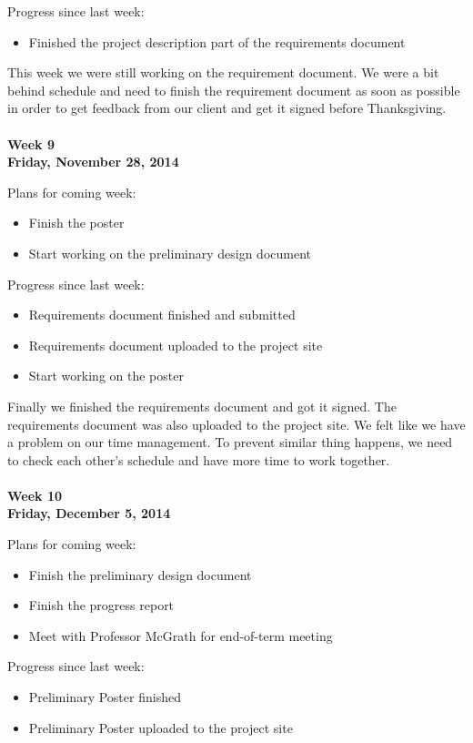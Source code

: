\noindent Progress since last week:
\begin{itemize}
\item Finished the project description part of the requirements document
\end{itemize}

\noindent This week we were still working on the requirement document. We were a bit behind schedule and need to finish the requirement document as soon as possible in order to get feedback from our client and get it signed before Thanksgiving. \\
\\
\textbf{Week 9\\Friday, November 28, 2014\\}

\noindent Plans for coming week:
\begin{itemize}
\item Finish the poster
\item Start working on the preliminary design document
\end{itemize}

\noindent Progress since last week:
\begin{itemize}
\item Requirements document finished and submitted
\item Requirements document uploaded to the project site
\item Start working on the poster
\end{itemize}

\noindent Finally we finished the requirements document and got it signed. The requirements document was also uploaded to the project site. We felt like we have a problem on our time management. To prevent similar thing happens, we need to check each other's schedule and have more time to work together. \\
\\
\textbf{Week 10\\Friday, December 5, 2014\\}

\noindent Plans for coming week:
\begin{itemize}
\item Finish the preliminary design document
\item Finish the progress report
\item Meet with Professor McGrath for end-of-term meeting
\end{itemize}

\noindent Progress since last week:
\begin{itemize}
\item Preliminary Poster finished
\item Preliminary Poster uploaded to the project site
\end{itemize}

